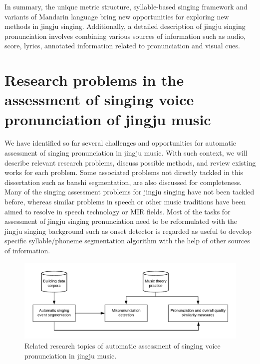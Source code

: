 In summary, the unique metric structure, syllable-based singing framework and variants of Mandarin language bring new opportunities for exploring new methods in jingju singing. Additionally, a detailed description of jingju singing pronunciation involves combining various sources of information such as audio, score, lyrics, annotated information related to pronunciation and visual cues.

\section{Research problems in the assessment of singing voice pronunciation of jingju music}\label{sec:ch3:research_problems}

We have identified so far several challenges and opportunities for automatic assessment of singing pronunciation in jingju music. With such context, we will describe relevant research problems, discuss possible methods, and review existing works for each problem. Some associated problems not directly tackled in this dissertation such as \gls{banshi} segmentation, are also discussed for completeness. Many of the singing assessment problems for jingju singing have not been tackled before, whereas similar problems in speech or other music traditions have been aimed to resolve in speech technology or \gls{MIR} fields. Most of the tasks for assessment of jingju singing pronunciation need to be reformulated with the jingju singing background such as onset detector is regarded as useful to develop specific syllable/phoneme segmentation algorithm with the help of other sources of information.

\begin{figure}[ht!]
\includegraphics[width=\textwidth]{figs/blockDiags_rong/ch3_related_topics.png}
\caption{Related research topics of automatic assessment of singing voice pronunciation in jingju music.}
\label{fig:related_research_topics}
\end{figure}


